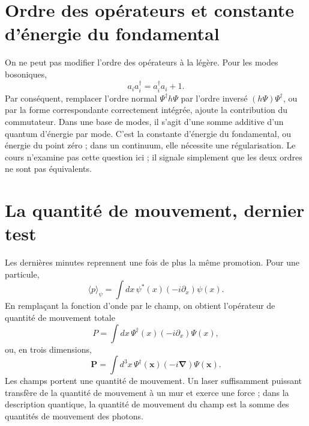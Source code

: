 \section{Ordre des opérateurs et constante d’énergie du fondamental}

On ne peut pas modifier l’ordre des opérateurs à la légère. Pour les modes bosoniques,
\begin{equation}
a_i a_i^\dagger=a_i^\dagger a_i+1.
\end{equation}
Par conséquent, remplacer l’ordre normal \(\Psi^\dagger h\Psi\) par l’ordre inversé \((h\Psi)\Psi^\dagger\), ou par la forme correspondante correctement intégrée, ajoute la contribution du commutateur. Dans une base de modes, il s’agit d’une somme additive d’un quantum d’énergie par mode. C’est la constante d’énergie du fondamental, ou énergie du point zéro ; dans un continuum, elle nécessite une régularisation. Le cours n’examine pas cette question ici ; il signale simplement que les deux ordres ne sont pas équivalents.

\begin{classroomqa}
\end{classroomqa}

\section{La quantité de mouvement, dernier test}

Les dernières minutes reprennent une fois de plus la même promotion. Pour une particule,
\begin{equation}
\langle p\rangle_\psi
=\int dx\,\psi^*(x)\left(-i\partial_x\right)\psi(x).
\label{eq:l07-one-particle-momentum}
\end{equation}
En remplaçant la fonction d’onde par le champ, on obtient l’opérateur de quantité de mouvement totale
\begin{equation}
P=\int dx\,\Psi^\dagger(x)\left(-i\partial_x\right)\Psi(x),
\label{eq:l07-field-momentum}
\end{equation}
ou, en trois dimensions,
\begin{equation}
\mathbf P=\int d^3x\,\Psi^\dagger(\mathbf x)
\left(-i\boldsymbol\nabla\right)\Psi(\mathbf x).
\end{equation}
Les champs portent une quantité de mouvement. Un laser suffisamment puissant transfère de la quantité de mouvement à un mur et exerce une force ; dans la description quantique, la quantité de mouvement du champ est la somme des quantités de mouvement des photons.

